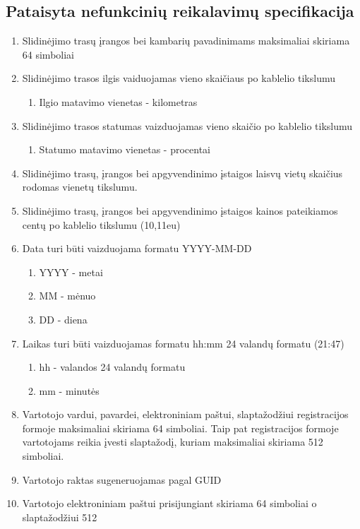 \documentclass[oneside]{VUMIFPSkursinis}
\begin{document}
\subsection{Pataisyta nefunkcinių reikalavimų specifikacija}
\begin{enumerate}
	\item Slidinėjimo trasų įrangos bei kambarių pavadinimams maksimaliai skiriama 64 simboliai
	\item Slidinėjimo trasos ilgis vaiduojamas vieno skaičiaus po kablelio tikslumu
	\begin{enumerate}
		\item Ilgio matavimo vienetas - kilometras
	\end{enumerate}
	\item Slidinėjimo trasos statumas vaizduojamas vieno skaičio po kablelio tikslumu
	\begin{enumerate}
		\item Statumo matavimo vienetas - procentai
	\end{enumerate}
	\item Slidinėjimo trasų, įrangos bei apgyvendinimo įstaigos laisvų vietų skaičius rodomas vienetų tikslumu.
	\item Slidinėjimo trasų, įrangos bei apgyvendinimo įstaigos kainos pateikiamos centų po kablelio tikslumu (10,11eu)
	\item Data turi būti vaizduojama formatu YYYY-MM-DD
	\begin{enumerate}
		\item YYYY - metai
		\item MM - mėnuo
		\item DD - diena
	\end{enumerate}
	\item Laikas turi būti vaizduojamas formatu hh:mm 24 valandų formatu (21:47)
	\begin{enumerate}
		\item hh - valandos 24 valandų formatu
		\item mm - minutės
	\end{enumerate}
	\item Vartotojo vardui, pavardei, elektroniniam paštui, slaptažodžiui registracijos formoje maksimaliai skiriama 64 simboliai. Taip pat registracijos formoje vartotojams reikia įvesti slaptažodį, kuriam maksimaliai skiriama 512 simboliai.
	\item Vartotojo raktas sugeneruojamas pagal GUID
	\item Vartotojo elektroniniam paštui prisijungiant skiriama 64 simboliai o slaptažodžiui 512

\end{enumerate}
\end{document}
